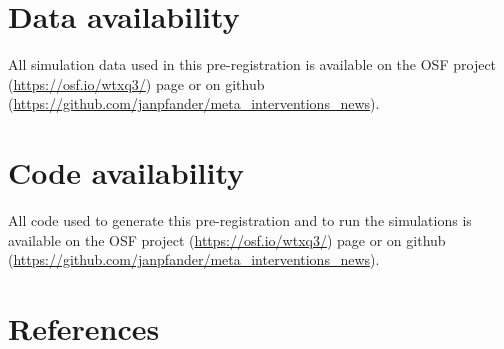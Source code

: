 \documentclass[
  man,mask,floatsintext]{apa6}
\begin{document}
\section{Data availability}\label{data-availability}

All simulation data used in this pre-registration is available on the OSF project (\url{https://osf.io/wtxq3/}) page or on github (\url{https://github.com/janpfander/meta_interventions_news}).

\section{Code availability}\label{code-availability}

All code used to generate this pre-registration and to run the simulations is available on the OSF project (\url{https://osf.io/wtxq3/}) page or on github (\url{https://github.com/janpfander/meta_interventions_news}).

\FloatBarrier

\section{References}\label{references}
\end{document}
